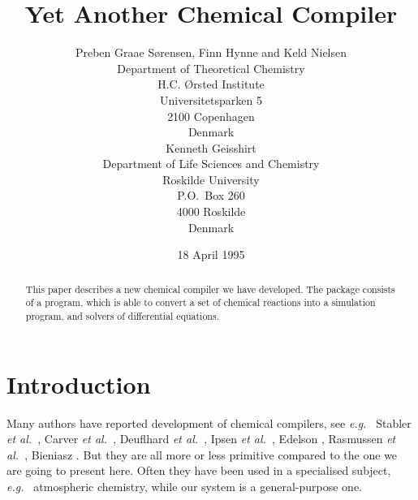 
\newcommand{\ie}{{\em i.e.\ }}
\newcommand{\eg}{{\em e.g.\ }}
\newcommand{\etc}{{\em etc.\ }}
\newcommand{\etal}{{\em et al.\ }}
\newcommand{\smbox}[1]{\mbox{{\footnotesize #1}}}
\newcommand{\diff}[2]{\frac{{\rm d}#1}{{\rm d}#2}}
\newcommand{\R}{{\rm R}}
\newcommand{\chem}[1]{\mbox{$\rm #1$}}
\author{Preben Graae S{\o}rensen, Finn Hynne and Keld Nielsen \\ Department of
  Theoretical Chemistry \\ H.C. {\O}rsted Institute \\
  Universitetsparken 5 \\ 2100 Copenhagen \\ Denmark \\
  Kenneth Geisshirt \\ Department of Life Sciences and Chemistry \\
  Roskilde University \\ P.O.\ Box 260 \\ 4000 Roskilde \\ Denmark} 
\title{Yet Another Chemical Compiler}
\date{18 April 1995}

 

%
\maketitle

\begin{abstract}
  This paper describes a new chemical compiler we have developed. The
  package consists of a program, which is able to convert a set of chemical
  reactions into a simulation program, and solvers of differential
  equations.
\end{abstract}

\section{Introduction}
Many authors have reported development of chemical compilers, see \eg
Stabler \etal \cite{Stabler78}, Carver \etal \cite{79}, Deuflhard
\etal \cite{Deuflhard}, Ipsen \etal \cite{Ipsen91}, Edelson
\cite{Edelson76}, Rasmussen \etal \cite{ChemSimul84}, Bieniasz
\cite{Bieniasz92}. But they are all 
more or less primitive compared to the one we are going to present
here. Often they have been used in a specialised subject, \eg
atmospheric chemistry, while our system is a general-purpose one.

